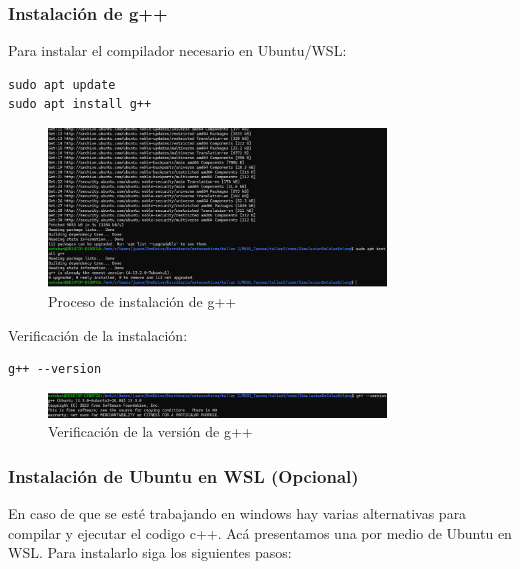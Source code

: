 \documentclass{article}
\begin{document}
\subsubsection{Instalación de g++}
Para instalar el compilador necesario en Ubuntu/WSL:
\begin{verbatim}
sudo apt update
sudo apt install g++
\end{verbatim}

\begin{figure}[H]
    \centering
    \includegraphics[width=0.8\textwidth]{images/manualUsuarioErlangBC_1.png}
    \caption{Proceso de instalación de g++}
    \label{fig:instalacion}
\end{figure}

Verificación de la instalación:
\begin{verbatim}
g++ --version
\end{verbatim}

\begin{figure}[H]
    \centering
    \includegraphics[width=0.8\textwidth]{images/manualUsuarioErlangBC_2.png}
    \caption{Verificación de la versión de g++}
    \label{fig:version}
\end{figure}

\subsubsection{Instalación de Ubuntu en WSL (Opcional)}
En caso de que se esté trabajando en windows hay varias alternativas para compilar y ejecutar el codigo c++. Acá presentamos una por medio de Ubuntu en WSL. Para instalarlo siga los siguientes pasos:
\end{document}
